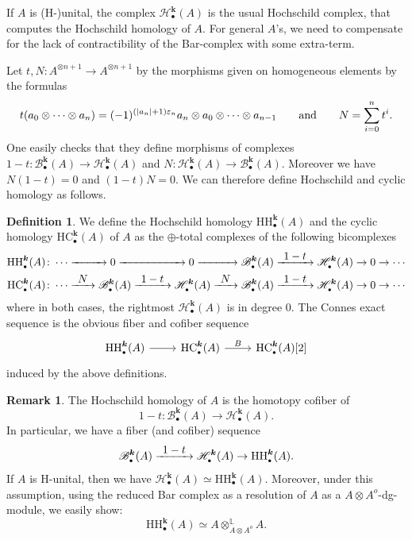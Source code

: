 \documentclass[JEP,XML,SOM,Unicode,NoEqCountersInSection]{cedram}
\let\mathcal\mathscr
\newcommand{\To}[1]{\mathchoice{\xrightarrow{\textstyle\kern4pt#1\kern3pt}}{\stackrel{#1}{\longrightarrow}}{}{}}
\let\ra\rightarrow
\newcommand{\sbullet}{{\scriptscriptstyle\bullet}}
\let\epsilon\varepsilon
\theoremstyle{definition}
\newtheorem{df}[thm]{Definition}
\newtheorem{rmq}[thm]{Remark}
\newcommand{\Lcot}{\mathbb{L}}
\newcommand{\Bc}{\mathcal{B}}
\newcommand{\Hc}{\mathcal{H}}
\newcommand{\HC}{\mathrm{HC}}
\newcommand{\HH}{\mathrm{HH}}
\renewcommand{\k}{{\boldsymbol{k}}}
\begin{document}
If $A$ is (H-)unital, the complex $\Hc_\sbullet^\k(A)$ is the usual Hochschild complex, that computes the Hochschild homology of $A$. For general $A$'s, we need to compensate for the lack of contractibility of the Bar-complex with some extra-term.

Let $t,N \colon A^{\otimes n+1} \to A^{\otimes n+1}$ by the morphisms given on homogeneous elements by the formulas
\[
t(a_0 \otimes \cdots \otimes a_n) = (-1)^{(|a_n|+1)\epsilon_n} a_n \otimes a_0 \otimes \cdots \otimes a_{n-1} \hspace{7mm} \text{and} \hspace{7mm} N = \sum_{i=0}^n t^i.
\]
One easily checks that they define morphisms of complexes $1-t \colon \Bc_\sbullet^\k(A) \to \Hc_\sbullet^\k(A)$ and $N \colon \Hc_\sbullet^\k(A) \to \Bc_\sbullet^\k(A)$. Moreover we have $N(1-t) = 0$ and $(1-t)N = 0$. We can therefore define Hochschild and cyclic homology as follows.

\begin{df}
We define the Hochschild homology $\HH_\sbullet^\k(A)$ and the cyclic homology $\HC_\sbullet^\k(A)$ of $A$ as the $\oplus$-total complexes of the following bicomplexes
\begin{align*}
\HH_\sbullet^\k(A)\colon&\cdots \To{\hspace*{7mm}}  0 \To{\hspace*{17mm}}  0 \To{\hspace*{8.5mm}}  \Bc_\sbullet^\k(A) \To{1-t}  \Hc_\sbullet^\k(A) \ra  0 \ra  \cdots
\\
\HC_\sbullet^\k(A) \colon&\cdots \To{N} \Bc_\sbullet^\k(A) \To{1-t}  \Hc_\sbullet^\k(A) \To{N}  \Bc_\sbullet^\k(A) \To{1-t} \Hc_\sbullet^\k(A) \ra  0 \ra\cdots
\end{align*}
where in both cases, the rightmost $\Hc_\sbullet^\k(A)$ is in degree $0$.
The Connes exact sequence is the obvious fiber and cofiber sequence
\[
\begin{tikzcd}
\HH_\sbullet^\k(A) \arrow[r] & \HC_\sbullet^\k(A) \arrow[r, "B"] & \HC_\sbullet^\k(A)[2]
\end{tikzcd}
\]
induced by the above definitions.
\end{df}

\begin{rmq}
The Hochschild homology of $A$ is the homotopy cofiber of
\[
1-t \colon \Bc_\sbullet^\k(A) \to \Hc_\sbullet^\k(A).
\]
In particular, we have a fiber (and cofiber) sequence
\[
\Bc_\sbullet^\k(A) \To{1-t} \Hc_\sbullet^\k(A) \to \HH_\sbullet^\k(A).
\]
If $A$ is H-unital, then we have $\Hc_\sbullet^\k(A) \simeq \HH_\sbullet^\k(A)$.
Moreover, under this assumption, using the reduced Bar complex as a resolution of $A$ as a $A \otimes A^o$-dg-module, we easily show:
\[
\HH_\sbullet^\k(A) \simeq A \otimes^\Lcot_{A \otimes A^o} A.
\]
\end{rmq}
\end{document}
